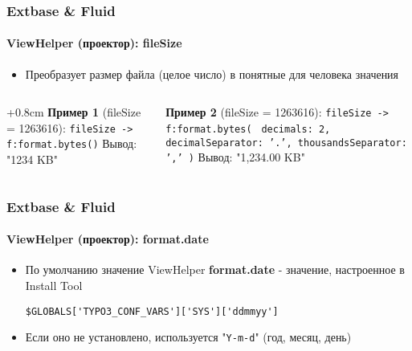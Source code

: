 \begin{frame}[fragile]
	\frametitle{Extbase \& Fluid}
	\framesubtitle{ViewHelper (проектор): fileSize}

	\begin{itemize}
		\item Преобразует размер файла (целое число) в понятные для человека значения\newline
	\end{itemize}

	\begin{columns}[T]

		\begin{column}{.5\textwidth}
			\advance\leftskip+0.8cm
			\smaller
				\textbf{Пример 1} (fileSize = 1263616):\newline
				\texttt{fileSize -> f:format.bytes()}\newline
				\newline
				Вывод: "1234 KB"
			\normalsize
		\end{column}
		\begin{column}{.5\textwidth}
			\smaller
				\textbf{Пример 2} (fileSize = 1263616):\newline
				\texttt{fileSize -> f:format.bytes(}\newline
				\texttt{
				decimals: 2,\newline
				decimalSeparator: '.',\newline
				thousandsSeparator: ','\newline
				)}\newline
				\newline
				Вывод: "1,234.00 KB"
			\normalsize
		\end{column}

	\end{columns}

\end{frame}


\begin{frame}[fragile]
	\frametitle{Extbase \& Fluid}
	\framesubtitle{ViewHelper (проектор): format.date}

	\lstset{
		basicstyle=\smaller\ttfamily
	}

	\begin{itemize}
		\item По умолчанию значение ViewHelper \textbf{format.date} - значение, настроенное в Install Tool

			\lstinline!$GLOBALS['TYPO3_CONF_VARS']['SYS']['ddmmyy']!

		\item Если оно не установлено, используется "\texttt{Y-m-d}" (год, месяц, день)

	\end{itemize}

\end{frame}

